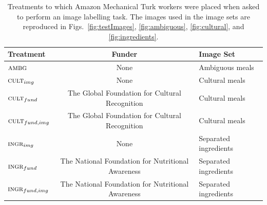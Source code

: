 \documentclass[letterpaper]{article}
\begin{document}
\begin{table}[t]
\centering
	\begin{tabular}{ l  c  l }
		\hline                       
		Treatment & Funder & Image Set	\\ 
		\hline                       
		$\textsc{ambg}$ & None & Ambiguous meals\\
		$\textsc{cult}_{img}$ & None & Cultural meals\\
		$\textsc{cult}_{fund}$ & The Global Foundation for Cultural Recognition& Cultural meals\\
		$\textsc{cult}_{fund,img}$ & The Global Foundation for Cultural Recognition& Cultural meals\\
		$\textsc{ingr}_{img}$ & None & Separated ingredients\\
		$\textsc{ingr}_{fund}$ & The National Foundation for Nutritional Awareness & Separated ingredients\\
		$\textsc{ingr}_{fund, img}$ & The National Foundation for Nutritional Awareness   & Separated ingredients\\
		\hline  
	\end{tabular}
	\caption{Treatments to which Amazon Mechanical Turk workers were 
		placed when asked to perform an image labelling task. The images
		used in the image sets are reproduced in 
		Figs.~\ref{fig:testImages}, \ref{fig:ambiguous}, \ref{fig:cultural}, and \ref{fig:ingredients}.
	}
	\label{table:1}
\end{table}

\end{document}
